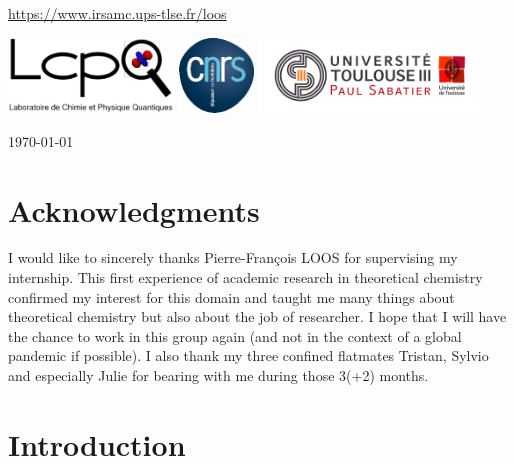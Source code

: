 \documentclass[11pt,a4paper]{article}
\begin{document}
\begin{center}
{\url{https://www.irsamc.ups-tlse.fr/loos}
} %

\vspace{0.5cm}
\includegraphics[height=2cm]{LCPQ_logo.pdf} \hfill \includegraphics[height=2cm]{LogoCNRS.eps} \hfill \includegraphics[height=2cm]{UPS_logo.jpg}

\end{center}

\vfill
\hfill \today

\newpage
\thispagestyle{empty}

\setlength{\parindent}{17pt}

\section*{Acknowledgments}

I would like to sincerely thanks Pierre-François \textsc{LOOS} for supervising my internship. This first experience of academic research in theoretical chemistry confirmed my interest for this domain and taught me many things about theoretical chemistry but also about the job of researcher. I hope that I will have the chance to work in this group again (and not in the context of a global pandemic if possible). I also thank my three confined flatmates Tristan, Sylvio and especially Julie for bearing with me during those 3(+2) months.

\tableofcontents

\newpage
\setcounter{page}{1}

\section{Introduction}
\label{sec:intro}
\end{document}
